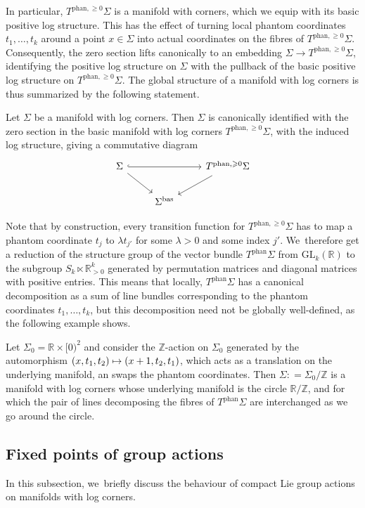 \documentclass[10pt]{amsart}
\newcommand\mto{\mathchoice{\longmapsto}{\mapsto}{\mapsto}{\mapsto}}
\theoremstyle{definition}
\theoremstyle{remark}
\newenvironment{example}
  {\pushQED{\qed}\renewcommand{\qedsymbol}{$\lozenge$}\examplex}
  {\popQED\endexamplex}
\newcommand{\RR}{\mathbb{R}}
\newcommand{\ZZ}{\mathbb{Z}}
\renewcommand{\ge}{\geqslant}
\newcommand{\defas}{\mathrel{\mathop:}=}
\newcommand{\Sig}{\Sigma}
\newcommand{\bas}[1]{{#1}^{\mathrm{bas}}}
\newcommand{\phant}{\mathrm{phan}}
\newcommand{\Sigbas}{\bas{\Sig}}
\newcommand{\tbphan}[2][]{T_{#1}^{\phant}#2}
\newcommand{\tbgephan}[2][]{T^{\phant,\ge0}_{#1}#2}
\newcommand{\GL}[2]{\mathrm{GL}_{#1}(#2)}
\begin{document}
In particular, $\tbgephan{\Sig}$ is a manifold with corners, which we equip with its basic positive log structure. This has the effect of turning local phantom coordinates $t_1,\ldots,t_k$ around a point $x\in \Sig$ into actual coordinates on the fibres of $\tbgephan{\Sig}$. Consequently, the zero section lifts canonically to an embedding $\Sig \to \tbgephan{\Sig}$, identifying the positive log structure on $\Sig$ with the pullback of the basic positive log structure on $\tbgephan{\Sig}$. The global structure of a manifold with log corners is thus summarized by the following statement.
\begin{proposition}\label{prop:embedding-in-phantom-tangent}
Let $\Sig$ be a manifold with log corners. Then $\Sig$ is canonically identified with the zero section in the basic manifold with log corners $\tbgephan{\Sig}$, with the induced log structure, giving a commutative diagram
\[
\begin{tikzcd}
\Sig \ar[rr,hook]\ar[rd] && \tbgephan{\Sig}\ar[ld] \\
& \Sigbas
\end{tikzcd}
\]
\end{proposition}

Note that by construction, every transition function for $\tbgephan{\Sig}$ has to map a phantom coordinate $t_j$ to $\lambda t_{j'}$ for some $\lambda>0$ and some index $j'$. We~therefore get a reduction of the structure group of the vector bundle $\tbphan{\Sig}$ from $\GL{k}{\RR}$ to the subgroup $S_k \ltimes \RR_{>0}^{k}$ generated by permutation matrices and diagonal matrices with positive entries. This means that locally, $\tbphan{\Sig}$ has a canonical decomposition as a sum of line bundles corresponding to the phantom coordinates $t_1,\ldots,t_k$, but this decomposition need not be globally well-defined, as the following example shows.

\begin{example}
Let $\Sig_0 = \RR \times [0)^2$ and consider the $\ZZ$-action on $\Sig_0$ generated by the automorphism $(x,t_1,t_2) \mto (x+1,t_2,t_1)$, which acts as a translation on the underlying manifold, an swaps the phantom coordinates. Then $\Sig\defas \Sig_0/\ZZ$ is a manifold with log corners whose underlying manifold is the circle $\RR/\ZZ$, and for which the pair of lines decomposing the fibres of $\tbphan{\Sig}$ are interchanged as we go around the circle.
\end{example}

\subsection{Fixed points of group actions} In this subsection, we~briefly discuss the behaviour of compact Lie group actions on manifolds with log corners.
\end{document}
